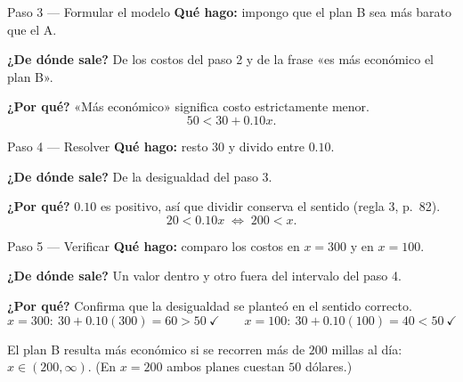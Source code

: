 \documentclass[11pt]{article}
\begin{document}
\begin{paso}{Paso 3 --- Formular el modelo}
\textbf{Qué hago:} impongo que el plan B sea más barato que el A.

\textbf{¿De dónde sale?} De los costos del paso 2 y de la frase «es más económico el plan B».

\textbf{¿Por qué?} «Más económico» significa costo estrictamente menor.
\[
50<30+0.10x.
\]
\end{paso}

\begin{paso}{Paso 4 --- Resolver}
\textbf{Qué hago:} resto $30$ y divido entre $0.10$.

\textbf{¿De dónde sale?} De la desigualdad del paso 3.

\textbf{¿Por qué?} $0.10$ es positivo, así que dividir conserva el sentido (regla 3, p.~82).
\[
20<0.10x \;\Longleftrightarrow\; 200<x.
\]
\end{paso}

\begin{paso}{Paso 5 --- Verificar}
\textbf{Qué hago:} comparo los costos en $x=300$ y en $x=100$.

\textbf{¿De dónde sale?} Un valor dentro y otro fuera del intervalo del paso 4.

\textbf{¿Por qué?} Confirma que la desigualdad se planteó en el sentido correcto.
\[
x=300:\ 30+0.10(300)=60>50 \ \checkmark
\qquad
x=100:\ 30+0.10(100)=40<50 \ \checkmark
\]
\end{paso}

\begin{resp}
El plan B resulta más económico si se recorren más de $200$ millas al día: $x\in(200,\infty)$. (En $x=200$ ambos planes cuestan $50$ dólares.)
\end{resp}
\end{document}

